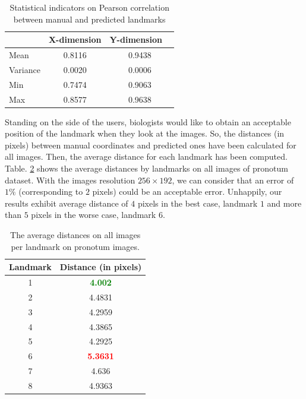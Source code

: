 \documentclass[review]{elsarticle}
\begin{document}
\begin{table}[htbp]
	\centering
	\begin{tabular}{ | l | c | c | }
\hline
	& X-dimension & Y-dimension  \  \\ \hline
	Mean & 0.8116 & 0.9438 \\ \hline
	Variance  & 0.0020 & 0.0006 \\ \hline
	Min  & 0.7474 & 0.9063 \\ \hline
	Max  & 0.8577 & 0.9638 \\ \hline
\end{tabular}
	\caption{Statistical indicators on Pearson correlation between manual and predicted landmarks}
	\label{tblcorrelation}
\end{table}

Standing on the side of the users, biologists would like to
obtain an acceptable position of the landmark when they look at the
images. So, the distances (in pixels) between manual coordinates and predicted
ones have been calculated for all images. Then, the average
distance for each landmark has been
computed. Table. \ref{tblavgpronotum} shows the average distances by
landmarks on all images of pronotum dataset. With the images
resolution $256 \times 192$, we can consider that an error of $1\%$
(corresponding to $2$ pixels) could 
be an acceptable error. Unhappily, our results exhibit average
distance of $4$ pixels in the best case, landmark $1$ and more than
$5$ pixels in the worse case, landmark $6$.

\begin{table}[htbp]
	\centering	
	\begin{tabular}{|c|c|}
		\hline
		\textbf{Landmark} & \textbf{Distance} (in pixels) \\ \hline
		1 & \textcolor{green}{\textbf{4.002}}  \\ \hline
		2 & 4.4831 \\ \hline
		3 & 4.2959 \\ \hline
		4 & 4.3865 \\ \hline
		5 & 4.2925 \\ \hline
		6 & \textcolor{red}{\textbf{5.3631}} \\ \hline
		7 & 4.636 \\ \hline
		8 & 4.9363 \\ \hline
	\end{tabular}
	\caption{The average distances on all images per landmark on pronotum images.}
	\label{tblavgpronotum}
\end{table}
\end{document}
